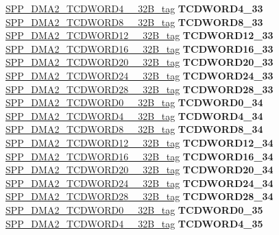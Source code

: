 \begin{DoxyCompactItemize}
\begin{tabbing}
\>\>\mbox{\hyperlink{unionSPP__DMA2__TCDWORD4____32B__tag}{SPP\_DMA2\_TCDWORD4\_\_32B\_tag}} {\bfseries TCDWORD4\_33}\\
\>\>\mbox{\hyperlink{unionSPP__DMA2__TCDWORD8____32B__tag}{SPP\_DMA2\_TCDWORD8\_\_32B\_tag}} {\bfseries TCDWORD8\_33}\\
\>\>\mbox{\hyperlink{unionSPP__DMA2__TCDWORD12____32B__tag}{SPP\_DMA2\_TCDWORD12\_\_32B\_tag}} {\bfseries TCDWORD12\_33}\\
\>\>\mbox{\hyperlink{unionSPP__DMA2__TCDWORD16____32B__tag}{SPP\_DMA2\_TCDWORD16\_\_32B\_tag}} {\bfseries TCDWORD16\_33}\\
\>\>\mbox{\hyperlink{unionSPP__DMA2__TCDWORD20____32B__tag}{SPP\_DMA2\_TCDWORD20\_\_32B\_tag}} {\bfseries TCDWORD20\_33}\\
\>\>\mbox{\hyperlink{unionSPP__DMA2__TCDWORD24____32B__tag}{SPP\_DMA2\_TCDWORD24\_\_32B\_tag}} {\bfseries TCDWORD24\_33}\\
\>\>\mbox{\hyperlink{unionSPP__DMA2__TCDWORD28____32B__tag}{SPP\_DMA2\_TCDWORD28\_\_32B\_tag}} {\bfseries TCDWORD28\_33}\\
\>\>\mbox{\hyperlink{unionSPP__DMA2__TCDWORD0____32B__tag}{SPP\_DMA2\_TCDWORD0\_\_32B\_tag}} {\bfseries TCDWORD0\_34}\\
\>\>\mbox{\hyperlink{unionSPP__DMA2__TCDWORD4____32B__tag}{SPP\_DMA2\_TCDWORD4\_\_32B\_tag}} {\bfseries TCDWORD4\_34}\\
\>\>\mbox{\hyperlink{unionSPP__DMA2__TCDWORD8____32B__tag}{SPP\_DMA2\_TCDWORD8\_\_32B\_tag}} {\bfseries TCDWORD8\_34}\\
\>\>\mbox{\hyperlink{unionSPP__DMA2__TCDWORD12____32B__tag}{SPP\_DMA2\_TCDWORD12\_\_32B\_tag}} {\bfseries TCDWORD12\_34}\\
\>\>\mbox{\hyperlink{unionSPP__DMA2__TCDWORD16____32B__tag}{SPP\_DMA2\_TCDWORD16\_\_32B\_tag}} {\bfseries TCDWORD16\_34}\\
\>\>\mbox{\hyperlink{unionSPP__DMA2__TCDWORD20____32B__tag}{SPP\_DMA2\_TCDWORD20\_\_32B\_tag}} {\bfseries TCDWORD20\_34}\\
\>\>\mbox{\hyperlink{unionSPP__DMA2__TCDWORD24____32B__tag}{SPP\_DMA2\_TCDWORD24\_\_32B\_tag}} {\bfseries TCDWORD24\_34}\\
\>\>\mbox{\hyperlink{unionSPP__DMA2__TCDWORD28____32B__tag}{SPP\_DMA2\_TCDWORD28\_\_32B\_tag}} {\bfseries TCDWORD28\_34}\\
\>\>\mbox{\hyperlink{unionSPP__DMA2__TCDWORD0____32B__tag}{SPP\_DMA2\_TCDWORD0\_\_32B\_tag}} {\bfseries TCDWORD0\_35}\\
\>\>\mbox{\hyperlink{unionSPP__DMA2__TCDWORD4____32B__tag}{SPP\_DMA2\_TCDWORD4\_\_32B\_tag}} {\bfseries TCDWORD4\_35}\\

\end{tabbing}
\end{DoxyCompactItemize}
